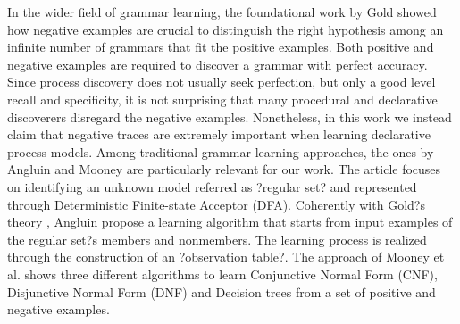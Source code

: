 In the wider field of grammar learning, the foundational work by Gold \cite{1967-Gold} showed how negative examples are crucial to distinguish the right hypothesis among an infinite number of grammars that fit the positive examples. Both positive and negative examples are required to discover a grammar with perfect accuracy. Since process discovery does not usually seek perfection, but only a good level recall and specificity, it is not surprising that many procedural and declarative discoverers disregard the negative examples. Nonetheless, in this work we instead claim that negative traces are extremely important when learning declarative process models.
Among traditional grammar learning approaches, the ones by Angluin \cite{1987-Angluin} and Mooney \cite{1995-Mooney} are particularly relevant for our work.
The article \cite{1987-Angluin} focuses on identifying an unknown model referred as ?regular set? and represented through Deterministic Finite-state Acceptor (DFA). Coherently with Gold?s theory  \cite{1967-Gold}, Angluin propose a learning algorithm that starts from input examples of the regular set?s members and nonmembers. The learning process is realized through the construction of an ?observation table?. %
The approach of Mooney et al. \cite{1995-Mooney} shows three different algorithms to learn Conjunctive Normal Form (CNF), Disjunctive Normal Form (DNF) and Decision trees from a set of positive and negative examples. 
 
